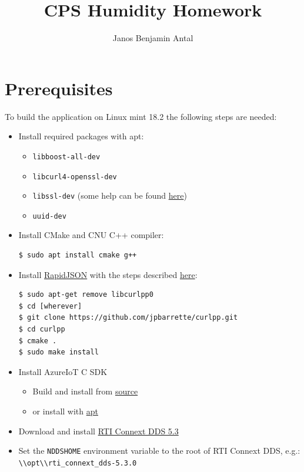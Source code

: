 \documentclass{article}
\author{Janos Benjamin Antal}
\title{CPS Humidity Homework}
\begin{document}
\maketitle
\section{Prerequisites}
To build the application on Linux mint 18.2 the following steps are needed:

\begin{itemize}
\item Install required packages with apt: 
\begin{itemize}
\item \verb+libboost-all-dev+
\item \verb+libcurl4-openssl-dev+
\item \verb+libssl-dev+ (some help can be found \href{https://unix.stackexchange.com/a/389170}{here})
\item \verb+uuid-dev+
\end{itemize}
\item Install CMake and CNU C++ compiler: 
\begin{lstlisting}
$ sudo apt install cmake g++
\end{lstlisting}
\item Install \href{http://rapidjson.org/}{RapidJSON} with the steps described \href{https://github.com/beniz/deepdetect/issues/126}{here}:
\begin{verbatim}
$ sudo apt-get remove libcurlpp0
$ cd [wherever]
$ git clone https://github.com/jpbarrette/curlpp.git
$ cd curlpp
$ cmake .
$ sudo make install
\end{verbatim} 
\item Install AzureIoT C SDK
\begin{itemize}
\item Build and install from \href{https://github.com/Azure/azure-iot-sdk-c/blob/master/doc/devbox_setup.md}{source}
\item or install with \href{https://github.com/Azure/azure-iot-sdk-c/blob/master/doc/ubuntu_apt-get_sample_setup.md}{apt}
\end{itemize}
\item Download and install \href{https://www.rti.com/gettingstarted/installlinux_secure}{RTI Connext DDS 5.3}
\item Set the \verb+NDDSHOME+ environment variable to the root of RTI Connext DDS, e.g.: \verb+\\opt\\rti_connext_dds-5.3.0+
\end{itemize}
\end{document}
